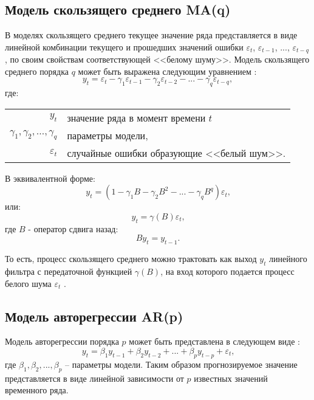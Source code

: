 \documentclass[a4paper,14pt,russian]{extreport}
\makeatletter
\newenvironment{eqwhere}
	{где:
		\par\noindent\hspace{2em}\begin{tabular}{>{$}r<{$} @{${}$ -- {}} l}
	}
	{\end{tabular}\par\vspace{\belowdisplayskip}}
\makeatother
\begin{document}
\subsection{Модель скользящего среднего MA(q)}
В моделях скользящего среднего текущее значение ряда представляется в виде 
линейной комбинации текущего и прошедших значений ошибки $\varepsilon_t$, 
$\varepsilon_{t-1}$, $...$, $\varepsilon_{t-q}$, по своим свойствам соответствующей 
<<белому шуму>>. Модель скользящего среднего порядка $q$ 
может быть выражена следующим уравнением \cite{runova2013}:
\begin{equation}
	y_t = \varepsilon_t - \gamma_1 \varepsilon_{t-1} - \gamma_2 \varepsilon_{t-2} 
		- ... - \gamma_q \varepsilon_{t-q}, 
\end{equation} 
\begin{eqwhere}
	y_t	& значение ряда в момент времени $t$ \\
	\gamma_1, \gamma_2, ..., \gamma_q 	& параметры модели, \\
	\varepsilon_t	& случайные ошибки образующие <<белый шум>>.\\
\end{eqwhere}
В эквивалентной форме:
\begin{equation}
	y_t = (1 - \gamma_1 B - \gamma_2 B^2 - ... - \gamma_q B^q)\varepsilon_t \text{,} 
\end{equation}
или:
\begin{equation}
	y_t = \gamma(B)\varepsilon_t \text{,} 
\end{equation}
где $B$ - оператор сдвига назад:
\begin{equation}
	B y_t = y_{t-1} \text{.} \nonumber
\end{equation}

То есть, процесс скользящего среднего можно трактовать как выход $y_t$ 
линейного фильтра с передаточной функцией $\gamma(B)$, на вход которого 
подается процесс белого шума $\varepsilon_t$ \cite{box2008}.


\subsection{Модель авторегрессии AR(p)}
Модель авторегрессии порядка $p$ может быть представлена в следующем 
виде \cite{runova2013}:
\begin{equation}
	y_t = \beta_1 y_{t-1} + \beta_2 y_{t-2} + ... + \beta_p y_{t-p} + \varepsilon_t \text{,} 
\end{equation}
где $\beta_1, \beta_2, ..., \beta_p$ -- параметры модели. Таким образом 
прогнозируемое значение представляется в виде линейной зависимости от $p$ 
известных значений временного ряда. 
\end{document}
